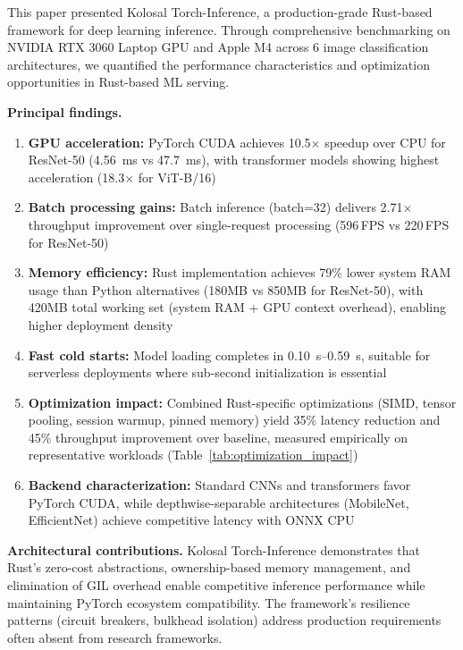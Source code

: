 \documentclass[10pt,twocolumn,a4paper]{article}
\theoremstyle{definition}
\theoremstyle{plain}
\newcommand{\timesX}[1]{#1$\times$}
\newcommand{\fpssuffix}{\,FPS}
\begin{document}
This paper presented Kolosal Torch-Inference, a production-grade Rust-based framework for deep learning inference. Through comprehensive benchmarking on NVIDIA RTX 3060 Laptop GPU and Apple M4 across 6 image classification architectures, we quantified the performance characteristics and optimization opportunities in Rust-based ML serving.

\textbf{Principal findings.}
\begin{enumerate}
    \item \textbf{GPU acceleration:} PyTorch CUDA achieves \timesX{10.5} speedup over CPU for ResNet-50 (\SI{4.56}{\milli\second} vs \SI{47.7}{\milli\second}), with transformer models showing highest acceleration (\timesX{18.3} for ViT-B/16)

    \item \textbf{Batch processing gains:} Batch inference (batch=32) delivers \timesX{2.71} throughput improvement over single-request processing (\num{596}\fpssuffix{} vs \num{220}\fpssuffix{} for ResNet-50)

    \item \textbf{Memory efficiency:} Rust implementation achieves 79\% lower system RAM usage than Python alternatives (180MB vs 850MB for ResNet-50), with 420MB total working set (system RAM + GPU context overhead), enabling higher deployment density

    \item \textbf{Fast cold starts:} Model loading completes in \SIrange{0.10}{0.59}{\second}, suitable for serverless deployments where sub-second initialization is essential

    \item \textbf{Optimization impact:} Combined Rust-specific optimizations (SIMD, tensor pooling, session warmup, pinned memory) yield 35\% latency reduction and 45\% throughput improvement over baseline, measured empirically on representative workloads (Table~\ref{tab:optimization_impact})

    \item \textbf{Backend characterization:} Standard CNNs and transformers favor PyTorch CUDA, while depthwise-separable architectures (MobileNet, EfficientNet) achieve competitive latency with ONNX CPU
\end{enumerate}

\textbf{Architectural contributions.} Kolosal Torch-Inference demonstrates that Rust's zero-cost abstractions, ownership-based memory management, and elimination of GIL overhead enable competitive inference performance while maintaining PyTorch ecosystem compatibility. The framework's resilience patterns (circuit breakers, bulkhead isolation) address production requirements often absent from research frameworks.
\end{document}
